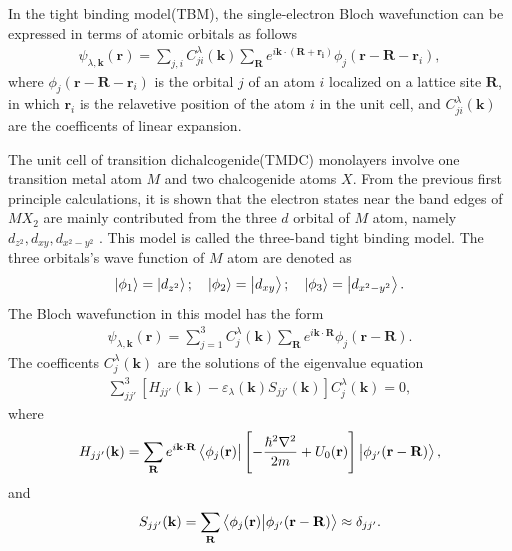 \documentclass{report}
\newcommand{\f}[2]{\dfrac{#1}{#2}}
\begin{document}
In the tight binding model(TBM), the single-electron Bloch wavefunction can be expressed in terms of atomic orbitals as follows
\begin{gather}
	\psi_{\lambda,\mathbf{k}}(\mathbf{r}) = \sum_{j,i} C_{ji}^{\lambda}(\mathbf{k}) \sum_{\mathbf{R}} e^{i\mathbf{k}\cdot(\mathbf{R+\mathbf{r}_{i}})} \phi_{j}(\mathbf{r} - \mathbf{R} - \mathbf{r}_{i}),
\end{gather}
where $\phi_{j}(\mathbf{r} - \mathbf{R} - \mathbf{r}_{i})$ is the orbital $j$ of an atom $i$ localized on a lattice site $\mathbf{R}$, in which $\mathbf{r}_{i}$ is the relavetive position of the atom $i$ in the unit cell, and $C_{ji}^{\lambda}(\mathbf{k})$ are the coefficents of linear expansion.

The unit cell of transition dichalcogenide(TMDC) monolayers involve one transition metal atom $M$ and two chalcogenide atoms $X$. From the previous first principle calculations, it is shown that the electron states near the band edges of $MX_{2}$ are mainly contributed from the three $d$ orbital of $M$ atom, namely $d_{z^{2}},d_{xy},d_{x^{2}-y^{2}}$ \cite{PhysRevB.88.085433}. This model is called the three-band tight binding model. The three orbitals's wave function of $M$ atom are denoted as
\begin{gather}
	\ket{\phi_{1}} = \ket{d_{z^{2}}} ; \quad \ket{\phi_{2}} = \ket{d_{xy}} ; \quad \ket{\phi_{3}} = \ket{d_{x^{2} - y^{2}}}.
\end{gather}
The Bloch wavefunction in this model has the form
\begin{gather}
	\psi_{\lambda,\mathbf{k}}(\mathbf{r}) = \sum_{j=1}^{3} C_{j}^{\lambda}(\mathbf{k}) \sum_{\mathbf{R}} e^{i \mathbf{k \cdot R}} \phi_{j}(\mathbf{r} - \mathbf{R}).
\end{gather}
The coefficents $C_{j}^{\lambda}(\mathbf{k})$ are the solutions of the eigenvalue equation
\begin{gather}
	\sum_{jj'}^{3} \left[H_{jj'}(\mathbf{k}) - \varepsilon_{\lambda}(\mathbf{k}) S_{jj'}(\mathbf{k})\right] C_{j}^{\lambda}(\mathbf{k}) = 0,
\end{gather}
where
\begin{gather}
	H_{jj'}(\mathbf{k}) = \sum_{\mathbf{R}} e^{i \mathbf{k \cdot R}} \bra{\phi_{j}(\mathbf{r})} \left[-\f{\hbar^{2} \nabla^{2}}{2m} + U_{0}(\mathbf{r})\right] \ket{\phi_{j'}(\mathbf{r - R})},
\end{gather}
and
\begin{gather}
	S_{jj'}(\mathbf{k}) = \sum_{\mathbf{R}} \bra{\phi_{j}(\mathbf{r})} \ket{\phi_{j'}(\mathbf{r - R})} \approx \delta_{jj'}.
\end{gather}
\end{document}
